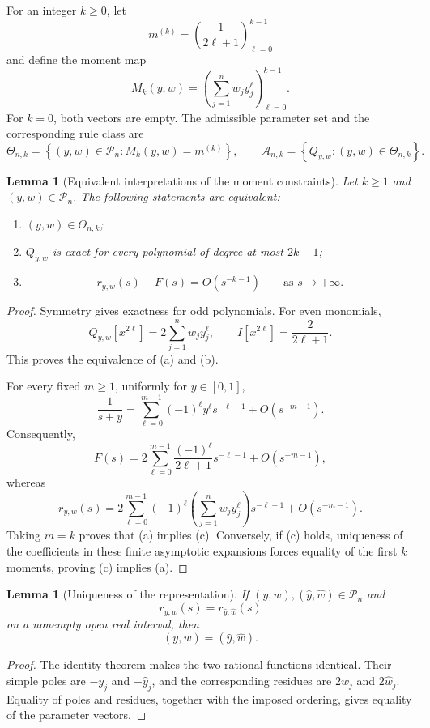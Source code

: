 \documentclass[preprint,12pt]{elsarticle}
\newtheorem{lemma}[theorem]{Lemma}
\theoremstyle{remark}
\begin{document}
For an integer \(k\geq0\), let
\[
m^{(k)}
=
\left(\frac{1}{2\ell+1}\right)_{\ell=0}^{k-1}
\]
and define the moment map
\[
M_k(y,w)
=
\left(
\sum_{j=1}^{n}w_jy_j^\ell
\right)_{\ell=0}^{k-1}.
\]
For \(k=0\), both vectors are empty. The admissible parameter set and
the corresponding rule class are
\[
\Theta_{n,k}
=
\left\{
(y,w)\in\mathcal P_n:
M_k(y,w)=m^{(k)}
\right\},
\qquad
\mathcal A_{n,k}
=
\left\{
Q_{y,w}:(y,w)\in\Theta_{n,k}
\right\}.
\]

\begin{lemma}[Equivalent interpretations of the moment constraints]
Let \(k\geq1\) and \((y,w)\in\mathcal P_n\). The following statements
are equivalent:
\begin{enumerate}[label=(\alph*)]
\item \((y,w)\in\Theta_{n,k}\);
\item \(Q_{y,w}\) is exact for every polynomial of degree at most
\(2k-1\);
\item
\[
r_{y,w}(s)-F(s)=O(s^{-k-1})
\qquad
\text{as }s\to+\infty.
\]
\end{enumerate}
\end{lemma}

\begin{proof}
Symmetry gives exactness for odd polynomials. For even monomials,
\[
Q_{y,w}[x^{2\ell}]
=
2\sum_{j=1}^{n}w_jy_j^\ell,
\qquad
I[x^{2\ell}]
=
\frac{2}{2\ell+1}.
\]
This proves the equivalence of (a) and (b).

For every fixed \(m\geq1\), uniformly for \(y\in[0,1]\),
\[
\frac{1}{s+y}
=
\sum_{\ell=0}^{m-1}
(-1)^\ell y^\ell s^{-\ell-1}
+
O(s^{-m-1}).
\]
Consequently,
\[
F(s)
=
2\sum_{\ell=0}^{m-1}
\frac{(-1)^\ell}{2\ell+1}s^{-\ell-1}
+
O(s^{-m-1}),
\]
whereas
\[
r_{y,w}(s)
=
2\sum_{\ell=0}^{m-1}
(-1)^\ell
\left(\sum_{j=1}^{n}w_jy_j^\ell\right)
s^{-\ell-1}
+
O(s^{-m-1}).
\]
Taking \(m=k\) proves that (a) implies (c). Conversely, if (c) holds,
uniqueness of the coefficients in these finite asymptotic expansions
forces equality of the first \(k\) moments, proving (c) implies (a).
\end{proof}

\begin{lemma}[Uniqueness of the representation]
If \((y,w),(\widehat y,\widehat w)\in\mathcal P_n\) and
\[
r_{y,w}(s)=r_{\widehat y,\widehat w}(s)
\]
on a nonempty open real interval, then
\[
(y,w)=(\widehat y,\widehat w).
\]
\end{lemma}

\begin{proof}
The identity theorem makes the two rational functions identical. Their
simple poles are \(-y_j\) and \(-\widehat y_j\), and the corresponding
residues are \(2w_j\) and \(2\widehat w_j\). Equality of poles and
residues, together with the imposed ordering, gives equality of the
parameter vectors.
\end{proof}
\end{document}
